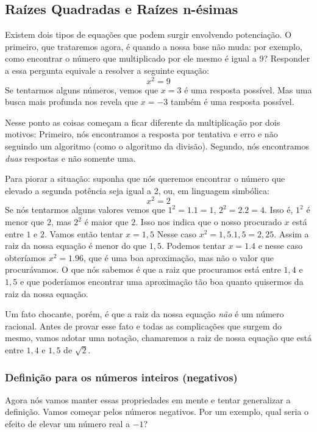 \subsection{Raízes Quadradas e Raízes n-ésimas}
Existem dois tipos de equações que podem surgir envolvendo potenciação. O primeiro, que trataremos agora, é quando a nossa base não muda: por exemplo, como encontrar o número que multiplicado por ele mesmo é igual a 9? Responder a essa pergunta equivale a resolver a seguinte equação: $$x^2=9$$Se tentarmos alguns números, vemos que $x=3$ é uma resposta possível. Mas uma busca mais profunda nos revela que $x=-3$ também é uma resposta possível.

Nesse ponto as coisas começam a ficar diferente da multiplicação por dois motivos: Primeiro, nós encontramos a resposta por tentativa e erro e não seguindo um algoritmo (como o algoritmo da divisão). Segundo, nós encontramos \textit{duas} respostas e não somente uma.

Para piorar a situação: suponha que nós queremos encontrar o número que elevado a segunda potência seja igual a 2, ou, em linguagem simbólica: $$x^2 = 2$$Se nós tentarmos alguns valores vemos que $1^2 = 1.1 = 1$, $2^2 = 2.2 = 4$. Isso é, $1^2$ é menor que $2$, mas $2^2$ é maior que $2$. Isso nos indica que o nosso procurado $x$ está entre $1$ e $2$. Vamos então tentar $x=1,5$ Nesse caso $x^2 = 1,5.1,5 = 2,25$. Assim a raiz da nossa equação é menor do que $1,5$. Podemos tentar $x = 1.4$ e nesse caso obteríamos $x^2 = 1.96$, que é uma boa aproximação, mas não o valor que procurávamos. O que nós sabemos é que a raiz que procuramos está entre $1,4$ e $1,5$ e que poderíamos encontrar uma aproximação tão boa quanto quisermos da raiz da nossa equação.

Um fato chocante, porém, é que a raiz da nossa equação \textit{não} é um número racional. Antes de provar esse fato e todas as complicações que surgem do mesmo, vamos adotar uma notação, chamaremos a raiz de nossa equação que está entre $1,4$ e $1,5$ de  $\sqrt{2}$. 



\subsubsection{Definição para os números inteiros (negativos)}
Agora nós vamos manter essas propriedades em mente e tentar generalizar a definição. Vamos começar pelos números negativos. Por um exemplo, qual seria o efeito de elevar um número real a $-1$?

